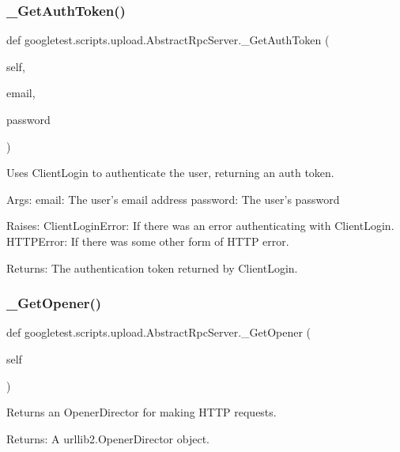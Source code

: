 \subsubsection{\texorpdfstring{\_GetAuthToken()}{\_GetAuthToken()}}
{\footnotesize\ttfamily def googletest.\+scripts.\+upload.\+Abstract\+Rpc\+Server.\+\_\+\+Get\+Auth\+Token (\begin{DoxyParamCaption}\item[{}]{self,  }\item[{}]{email,  }\item[{}]{password }\end{DoxyParamCaption})\hspace{0.3cm}{\ttfamily [private]}}

\begin{DoxyVerb}Uses ClientLogin to authenticate the user, returning an auth token.

Args:
  email:    The user's email address
  password: The user's password

Raises:
  ClientLoginError: If there was an error authenticating with ClientLogin.
  HTTPError: If there was some other form of HTTP error.

Returns:
  The authentication token returned by ClientLogin.
\end{DoxyVerb}
 \mbox{\label{classgoogletest_1_1scripts_1_1upload_1_1_abstract_rpc_server_a63eceb4f0652dd8b366a9d1c68405d28}} 
\subsubsection{\texorpdfstring{\_GetOpener()}{\_GetOpener()}}
{\footnotesize\ttfamily def googletest.\+scripts.\+upload.\+Abstract\+Rpc\+Server.\+\_\+\+Get\+Opener (\begin{DoxyParamCaption}\item[{}]{self }\end{DoxyParamCaption})\hspace{0.3cm}{\ttfamily [private]}}

\begin{DoxyVerb}Returns an OpenerDirector for making HTTP requests.

Returns:
  A urllib2.OpenerDirector object.
\end{DoxyVerb}
 


